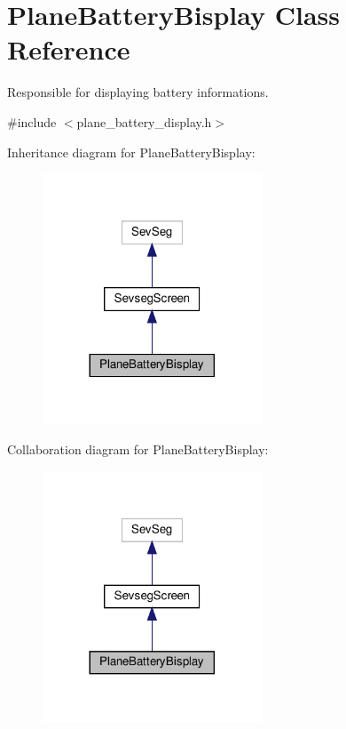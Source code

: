 \hypertarget{class_plane_battery_bisplay}{}\section{Plane\+Battery\+Bisplay Class Reference}
\label{class_plane_battery_bisplay}


Responsible for displaying battery informations.  




{\ttfamily \#include $<$plane\+\_\+battery\+\_\+display.\+h$>$}



Inheritance diagram for Plane\+Battery\+Bisplay\+:\nopagebreak
\begin{figure}[H]
\begin{center}
\leavevmode
\includegraphics[width=185pt]{class_plane_battery_bisplay__inherit__graph}
\end{center}
\end{figure}


Collaboration diagram for Plane\+Battery\+Bisplay\+:\nopagebreak
\begin{figure}[H]
\begin{center}
\leavevmode
\includegraphics[width=185pt]{class_plane_battery_bisplay__coll__graph}
\end{center}
\end{figure}
